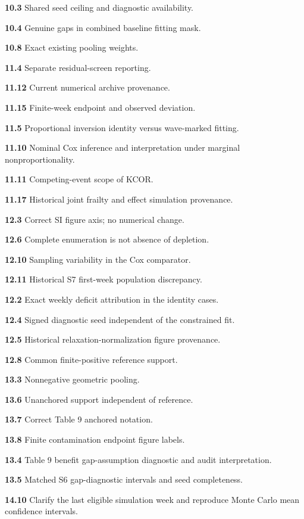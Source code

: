\documentclass[
]{article}
\begin{document}
\par\hypertarget{issue-10.3}{}\textbf{10.3} Shared seed ceiling and diagnostic availability.\par\hypertarget{issue-10.4}{}\textbf{10.4} Genuine gaps in combined baseline fitting mask.\par\hypertarget{issue-10.8}{}\textbf{10.8} Exact existing pooling weights.\par\hypertarget{issue-11.4}{}\textbf{11.4} Separate residual-screen reporting.\par\hypertarget{issue-11.12}{}\textbf{11.12} Current numerical archive provenance.\par\hypertarget{issue-11.15}{}\textbf{11.15} Finite-week endpoint and observed deviation.\par\hypertarget{issue-11.5}{}\textbf{11.5} Proportional inversion identity versus wave-marked fitting.\par\hypertarget{issue-11.10}{}\textbf{11.10} Nominal Cox inference and interpretation under marginal nonproportionality.\par\hypertarget{issue-11.11}{}\textbf{11.11} Competing-event scope of KCOR.\par\hypertarget{issue-11.17}{}\textbf{11.17} Historical joint frailty and effect simulation provenance.\par\hypertarget{issue-12.3}{}\textbf{12.3} Correct SI figure axis; no numerical change.\par\hypertarget{issue-12.6}{}\textbf{12.6} Complete enumeration is not absence of depletion.\par\hypertarget{issue-12.10}{}\textbf{12.10} Sampling variability in the Cox comparator.\par\hypertarget{issue-12.11}{}\textbf{12.11} Historical S7 first-week population discrepancy.\par\hypertarget{issue-12.2}{}\textbf{12.2} Exact weekly deficit attribution in the identity cases.\par\hypertarget{issue-12.4}{}\textbf{12.4} Signed diagnostic seed independent of the constrained fit.\par\hypertarget{issue-12.5}{}\textbf{12.5} Historical relaxation-normalization figure provenance.\par\hypertarget{issue-12.8}{}\textbf{12.8} Common finite-positive reference support.\par\hypertarget{issue-13.3}{}\textbf{13.3} Nonnegative geometric pooling.\par\hypertarget{issue-13.6}{}\textbf{13.6} Unanchored support independent of reference.\par\hypertarget{issue-13.7}{}\textbf{13.7} Correct Table 9 anchored notation.\par\hypertarget{issue-13.8}{}\textbf{13.8} Finite contamination endpoint figure labels.\par\hypertarget{issue-13.4}{}\textbf{13.4} Table 9 benefit gap-assumption diagnostic and audit interpretation.\par\hypertarget{issue-13.5}{}\textbf{13.5} Matched S6 gap-diagnostic intervals and seed completeness.\par\hypertarget{issue-14.10}{}\textbf{14.10} Clarify the last eligible simulation week and reproduce Monte Carlo mean confidence intervals.
\end{document}
